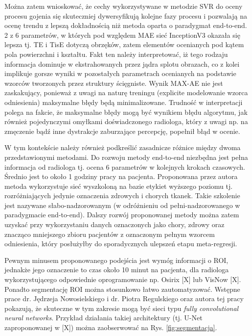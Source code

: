 Można zatem wnioskować, że cechy wykorzystywane w metodzie SVR do oceny procesu gojenia się skuteczniej dywersyfikują kolejne fazy procesu i pozwalają na ocenę trendu z lepszą dokładnością niż metoda oparta o paradygmat end-to-end. 2 z 6 parametrów, w których pod względem MAE sieć InceptionV3 okazała się lepsza tj. TE i TisE dotyczą obrzęków, zatem elementów ocenianych pod kątem pola powierzchni i kształtu. Fakt ten należy interpretować, iż tego rodzaju informacja dominuje w ekstrahowanych przez jądra splotu obrazach, co z kolei implikuje gorsze wyniki w pozostałych parametrach ocenianych na podstawie wzorców tworzonych przez struktury ścięgniste. Wynik MAX-AE nie jest zaskakujący, ponieważ z uwagi na naturę treningu (explicite modelowanie wzorca odniesienia) maksymalne błędy będą minimalizowane. Trudność w interpretacji polega na fakcie, że maksymalne błędy mogą być wynikiem błędu algorytmu, jak również pojedynczymi omyłkami doświadczonego radiologa, który z uwagi np. na zmęczenie bądź inne dystrakcje zaburzające percepcję, popełnił błąd w ocenie.  

W tym kontekście należy również podkreślić zasadnicze różnice między dwoma przedstawionymi metodami. Do rozwoju metody end-to-end niezbędna jest pełna informacja od radiologa tj. ocena 6 parametrów w kolejnych krokach czasowych. Średnio jest to około 1 godziny pracy na pacjenta. Proponowana przez autora metoda wykorzystuje sieć wyszkoloną na bazie etykiet wyższego poziomu tj. rozróżniających jedynie oznaczenia zdrowych i chorych tkanek. Takie szkolenie jest nazywane słabo-nadzorowanym (w odróżnieniu od pełni-nadzorowanego w paradygmacie end-to-end). Dalszy rozwój proponowanej metody można zatem uzyskać przy wykorzystaniu danych oznaczonych jako chory, zdrowy oraz znacząco mniejszego zbioru pacjentów z oznaczonym pełnym wzorcem odniesienia, który posłużyłby do sporadycznych ulepszeń etapu meta-regresji. 

Pewnym minusem proponowanego podejścia jest wymóg informacji o ROI, jednakże jego oznaczenie to czas około 10 minut na pacjenta, dla radiologa wykorzystującego odpowiednie oprogramowanie np. Osirix [X] lub VisNow [X]. Ponadto segmentację ROI można stosunkowo łatwo zautomatyzować. Wstępne prace dr. Jędrzeja Nowosielskiego i dr. Piotra Regulskiego oraz autora tej pracy pokazują, że skuteczne w tym zakresie mogą być sieci typu \textit{fully convolutional neural networks}. Przykład działania takiej architektury (tj. U-Net zaproponowanej w [X]) można zaobserwować na Rys. \ref{fig:segmentacja}. 

